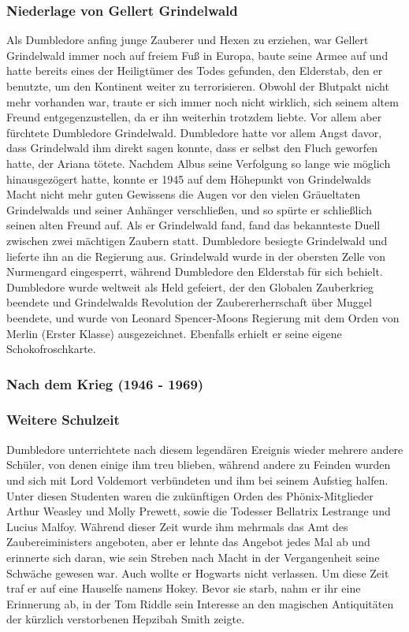\documentclass[a4paper, 10pt]{article}
\begin{document}
\subsubsection*{Niederlage von Gellert Grindelwald}
Als Dumbledore anfing junge Zauberer und Hexen zu erziehen, war Gellert Grindelwald immer noch auf freiem Fuß in Europa, baute seine Armee auf und hatte bereits eines der Heiligtümer des Todes gefunden, den Elderstab, den er benutzte, um den Kontinent weiter zu terrorisieren. Obwohl der Blutpakt nicht mehr vorhanden war, traute er sich immer noch nicht wirklich, sich seinem altem Freund entgegenzustellen, da er ihn weiterhin trotzdem liebte. Vor allem aber fürchtete Dumbledore Grindelwald. Dumbledore hatte vor allem Angst davor, dass Grindelwald ihm direkt sagen konnte, dass er selbst den Fluch geworfen hatte, der Ariana tötete. Nachdem Albus seine Verfolgung so lange wie möglich hinausgezögert hatte, konnte er 1945 auf dem Höhepunkt von Grindelwalds Macht nicht mehr guten Gewissens die Augen vor den vielen Gräueltaten Grindelwalds und seiner Anhänger verschließen, und so spürte er schließlich seinen alten Freund auf. Als er Grindelwald fand, fand das bekannteste Duell zwischen zwei mächtigen Zaubern statt. Dumbledore besiegte Grindelwald und lieferte ihn an die Regierung aus. Grindelwald wurde in der obersten Zelle von Nurmengard eingesperrt, während Dumbledore den Elderstab für sich behielt. Dumbledore wurde weltweit als Held gefeiert, der den Globalen Zauberkrieg beendete und Grindelwalds Revolution der Zaubererherrschaft über Muggel beendete, und wurde von Leonard Spencer-Moons Regierung mit dem Orden von Merlin (Erster Klasse) ausgezeichnet. Ebenfalls erhielt er seine eigene Schokofroschkarte.

\subsubsection*{\large Nach dem Krieg (1946 - 1969)}
\subsubsection*{Weitere Schulzeit}
Dumbledore unterrichtete nach diesem legendären Ereignis wieder mehrere andere Schüler, von denen einige ihm treu blieben, während andere zu Feinden wurden und sich mit Lord Voldemort verbündeten und ihm bei seinem Aufstieg halfen. Unter diesen Studenten waren die zukünftigen Orden des Phönix-Mitglieder Arthur Weasley und Molly Prewett, sowie die Todesser Bellatrix Lestrange und Lucius Malfoy. Während dieser Zeit wurde ihm mehrmals das Amt des Zaubereiministers angeboten, aber er lehnte das Angebot jedes Mal ab und erinnerte sich daran, wie sein Streben nach Macht in der Vergangenheit seine Schwäche gewesen war. Auch wollte er Hogwarts nicht verlassen.
\vspace{10pt}
\newline
{}  
Um diese Zeit traf er auf eine Hauselfe namens Hokey. Bevor sie starb, nahm er ihr eine Erinnerung ab, in der Tom Riddle sein Interesse an den magischen Antiquitäten der kürzlich verstorbenen Hepzibah Smith zeigte.
\end{document}
